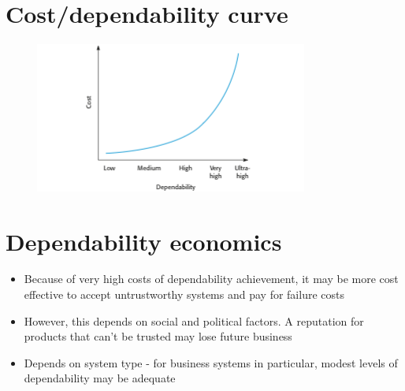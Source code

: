 \section{Cost/dependability curve}
\begin{figure}[h!]
    \centering
    \includegraphics[width = 0.8\textwidth]{./figures/L4_2.png}
    \caption{}
    \label{fig:L4_2}
\end{figure}


\section{Dependability economics}
\begin{itemize}
\item Because of very high costs of dependability achievement, it may be more cost effective to accept untrustworthy systems and pay for failure costs

\item However, this depends on social and political factors. A reputation for products that can’t be trusted may lose future business

\item Depends on system type - for business systems in particular, modest levels of dependability may be adequate

\end{itemize}

